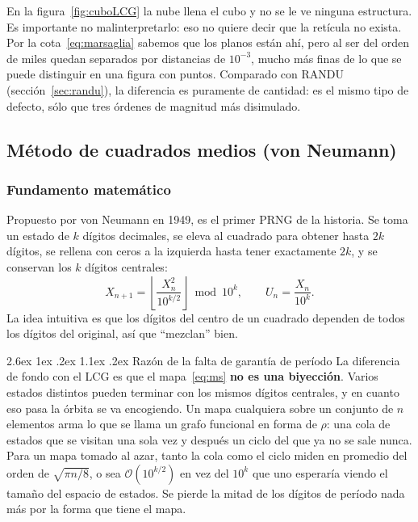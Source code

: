 \documentclass[11pt,letterpaper]{article}
\makeatletter
\renewcommand\paragraph{\@startsection{paragraph}{4}{\z@}%
  {2.6ex \@plus 1ex \@minus .2ex}%
  {1.1ex \@plus .2ex}%
  {\normalfont\normalsize\bfseries}}
\makeatother
\begin{document}
En la figura~\ref{fig:cuboLCG} la nube llena el cubo y no se le ve ninguna
estructura. Es importante no malinterpretarlo: eso no quiere decir que la retícula no
exista. Por la cota~\eqref{eq:marsaglia} sabemos que los planos están ahí,
pero al ser del orden de miles quedan separados por distancias de $10^{-3}$,
mucho más finas de lo que se puede distinguir en una figura con \NTernas{}
puntos. Comparado con RANDU (sección~\ref{sec:randu}), la diferencia es
puramente de cantidad: es el mismo tipo de defecto, sólo que tres órdenes de
magnitud más disimulado.

\subsection{Método de cuadrados medios (von Neumann)}

\subsubsection{Fundamento matemático}

Propuesto por von Neumann en 1949, es el primer PRNG de la historia. Se toma
un estado de $k$ dígitos decimales, se eleva al cuadrado para obtener hasta
$2k$ dígitos, se rellena con ceros a la izquierda hasta tener exactamente
$2k$, y se conservan los $k$ dígitos centrales:
\begin{equation}
X_{n+1} = \left\lfloor \frac{X_n^2}{10^{k/2}} \right\rfloor \bmod 10^{k},
\qquad U_n = \frac{X_n}{10^k}.
\label{eq:ms}
\end{equation}
La idea intuitiva es que los dígitos del centro de un cuadrado dependen de
todos los dígitos del original, así que ``mezclan'' bien.

\paragraph{Razón de la falta de garantía de período} La diferencia de
fondo con el LCG es que el mapa~\eqref{eq:ms} \textbf{no es una biyección}.
Varios estados distintos pueden terminar con los mismos dígitos centrales, y
en cuanto eso pasa la órbita se va encogiendo. Un mapa cualquiera sobre un
conjunto de $n$ elementos arma lo que se llama un grafo funcional en forma de
$\rho$: una cola de estados que se visitan una sola vez y después un ciclo
del que ya no se sale nunca. Para un mapa tomado al azar, tanto la cola como
el ciclo miden en promedio del orden de $\sqrt{\pi n/8}$, o sea
$\mathcal{O}(10^{k/2})$ en vez del $10^k$ que uno esperaría viendo el tamaño
del espacio de estados. Se pierde la mitad de los dígitos de período nada más
por la forma que tiene el mapa.
\end{document}
